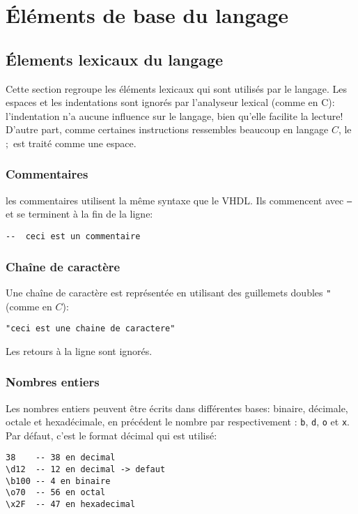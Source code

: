 \chapter{Éléments de base du langage}
\section{Élements lexicaux du langage}
Cette section regroupe les éléments lexicaux qui sont utilisés par le langage. Les espaces et les indentations sont ignorés par l'analyseur lexical (comme en C): l'indentation n'a aucune influence sur le langage, bien qu'elle facilite la lecture!
D'autre part, comme certaines instructions ressembles beaucoup en langage $C$, le $;$  est traité comme une espace.
\subsection{Commentaires}
\label{sec:commentaire}
les commentaires utilisent la même syntaxe que le VHDL. Ils commencent avec \texttt{--} et se terminent à la fin de la ligne:
\begin{lstlisting}
--  ceci est un commentaire
\end{lstlisting}

\subsection{Chaîne de caractère}
\label{sec:chaines}
Une chaîne de caractère est représentée en utilisant des guillemets doubles \texttt{"} (comme en $C$):
\begin{lstlisting}
"ceci est une chaine de caractere"
\end{lstlisting}
Les retours à la ligne sont ignorés.

\subsection{Nombres entiers}
\label{sec:nombres}
Les nombres entiers peuvent être écrits dans différentes bases: binaire, décimale, octale et hexadécimale, en précédent le nombre par respectivement : \texttt{\bs b}, \texttt{\bs d}, \texttt{\bs o} et \texttt{\bs x}. Par défaut, c'est le format décimal qui est utilisé:
\begin{lstlisting}
38    -- 38 en decimal
\d12  -- 12 en decimal -> defaut
\b100 -- 4 en binaire
\o70  -- 56 en octal
\x2F  -- 47 en hexadecimal
\end{lstlisting}

